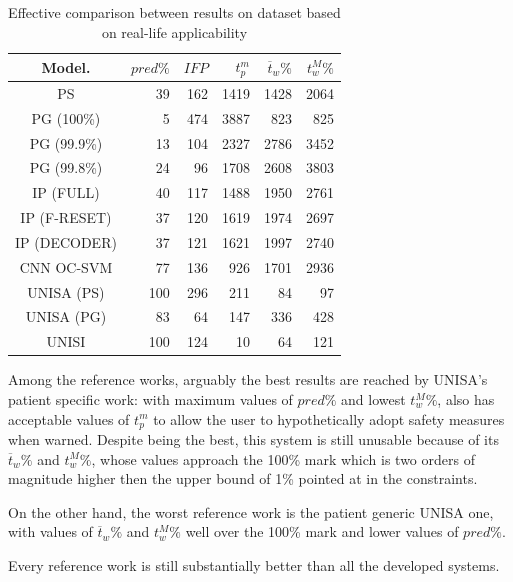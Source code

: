 \begin{table}[ht]
    \centering
    \begin{tabular}{c|rrrrr}
    Model.  & $pred\%$ & $IFP$ & $t_p^m$  & $\overline{t}_w\%$  & $t_w^M\%$   \\ \hline
    PS           & 39   & 162   & 1419  & 1428     & 2064     \\
    PG (100\%)   & 5    & 474   & 3887  & 823      & 825      \\
    PG (99.9\%)  & 13   & 104   & 2327  & 2786     & 3452     \\
    PG (99.8\%)  & 24   & 96    & 1708  & 2608     & 3803     \\
    IP (FULL)    & 40   & 117   & 1488  & 1950     & 2761     \\
    IP (F-RESET) & 37   & 120   & 1619  & 1974     & 2697     \\
    IP (DECODER) & 37   & 121   & 1621  & 1997     & 2740     \\
    CNN OC-SVM   & 77   & 136   & 926   & 1701     & 2936     \\
    UNISA (PS)   & 100  & 296   & 211   & 84       & 97       \\
    UNISA (PG)   & 83   & 64    & 147   & 336      & 428      \\
    UNISI        & 100  & 124   & 10    & 64       & 121      \\  \hline
    \end{tabular}
    \caption{Effective comparison between results on  dataset based on real-life applicability}
    \label{tab:real-life-comparison} 
\end{table}

Among the reference works, arguably the best results are reached by \gls{UNISA}'s patient specific work: with maximum values of $pred\%$ and lowest $t_w^M\%$, also has acceptable values of $t_p^m$ to allow the user to hypothetically adopt safety measures when warned. Despite being the best, this system is still unusable because of its $\overline{t}_w\%$ and $t_w^M\%$, whose values approach the 100\% mark which is two orders of magnitude higher then the upper bound of 1\% pointed at in the constraints.

On the other hand, the worst reference work is the patient generic \gls{UNISA} one, with values of  $\overline{t}_w\%$ and $t_w^M\%$ well over the 100\% mark and lower values of $pred\%$.

Every reference work is still substantially better than all the developed systems.

